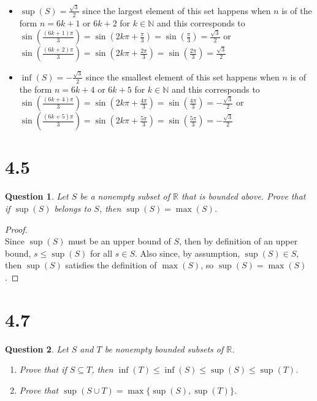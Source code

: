 \documentclass[10pt,a4paper]{article}
\newtheorem*{question*}{Question}
\theoremstyle{definition}
\begin{document}
\begin{enumerate}[label = (\alph*)]
\begin{itemize}
\item $\sup(S) = \frac{\sqrt{3}}{2}$ since the largest element of this set happens when $n$ is of the form $n = 6k + 1$ or $6k + 2$ for $k \in \mathbb{N}$ and this corresponds to $\sin(\frac{(6k + 1)\pi}{3}) = \sin(2k\pi + \frac{\pi}{3}) = \sin(\frac{\pi}{3}) = \frac{\sqrt{3}}{2}$ or $\sin(\frac{(6k + 2)\pi}{3}) = \sin(2k\pi + \frac{2\pi}{3}) = \sin(\frac{2\pi}{3}) = \frac{\sqrt{3}}{2}$
\item $\inf(S) = -\frac{\sqrt{3}}{2}$ since the smallest element of this set happens when $n$ is of the form $n = 6k + 4$ or $6k + 5$ for $k \in \mathbb{N}$ and this corresponds to $\sin(\frac{(6k + 4)\pi}{3}) = \sin(2k\pi + \frac{4\pi}{3}) = \sin(\frac{4\pi}{3}) = -\frac{\sqrt{3}}{2}$ or $\sin(\frac{(6k + 5)\pi}{3}) = \sin(2k\pi + \frac{5\pi}{3}) = \sin(\frac{5\pi}{3}) = -\frac{\sqrt{3}}{2}$
\end{itemize}
\end{enumerate}

\section*{4.5}

\begin{question*}
Let $S$ be a nonempty subset of $\mathbb{R}$ that is bounded above. Prove that if $\sup(S)$ belongs to $S$, then $\sup(S) = \max(S)$. 
\end{question*}

\begin{proof}{$ $}
\\Since $\sup(S)$ must be an upper bound of $S$, then by definition of an upper bound, $s \leq \sup(S)$ for all $s \in S$. Also since, by assumption, $\sup(S) \in S$, then $\sup(S)$ satisfies the definition of $\max(S)$, so $\sup(S) = \max(S)$.
\end{proof}

\section*{4.7}

\begin{question*}
Let $S$ and $T$ be nonempty bounded subsets of $\mathbb{R}$.
\begin{enumerate}[label = (\alph*)]
\item Prove that if $S \subseteq T$, then $\inf(T) \leq \inf(S) \leq \sup(S) \leq \sup(T)$.
\item Prove that $\sup(S \cup T) = \max\{\sup(S), \sup(T)\}$.
\end{enumerate}
\end{question*}
\end{document}
